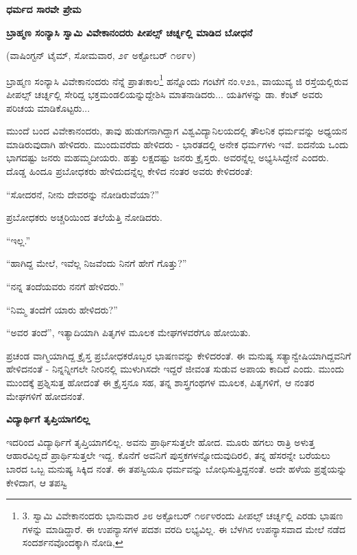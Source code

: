\begin{center}
\textbf{ಧರ್ಮದ ಸಾರವೇ ಪ್ರೇಮ}
\end{center}

\begin{center}
\textbf{ಬ್ರಾಹ್ಮಣ ಸಂನ್ಯಾಸಿ ಸ್ವಾಮಿ ವಿವೇಕಾನಂದರು ಪೀಪಲ್ಸ್ ಚರ್ಚ್ನಲ್ಲಿ ಮಾಡಿದ ಬೋಧನೆ}
\end{center}

(ವಾಷಿಂಗ್ಟನ್ ಟೈಮ್​, ಸೋಮವಾರ, ೨೯ ಅಕ್ಟೋಬರ್ ೧೮೯೪)

ಬ್ರಾಹ್ಮಣ ಸಂನ್ಯಾಸಿ ವಿವೇಕಾನಂದರು ನೆನ್ನೆ ಪ್ರಾತಃಕಾಲ\footnote{3. ಸ್ವಾಮಿ ವಿವೇಕಾನಂದರು ಭಾನುವಾರ ೨೮ ಅಕ್ಟೋಬರ್ ೧೮೯೪ರಂದು ಪೀಪಲ್ಸ್ ಚರ್ಚ್ನಲ್ಲಿ ಎರಡು ಭಾಷಣ ಗಳನ್ನು ಮಾಡಿದ್ದಾರೆ. ಈ ಉಪನ್ಯಾಸಗಳ ಪದಶಃ ವರದಿ ಲಭ್ಯವಿಲ್ಲ. ಈ ಬೆಳಗಿನ ಉಪನ್ಯಾಸವಾದ ಮೇಲೆ ನಡೆದ ಸಂದರ್ಶನವೊಂದಕ್ಕಾಗಿ ನೋಡಿ, } ಹನ್ನೊಂದು ಗಂಟೆಗೆ ನಂ.೪೨೩, ವಾಯುವ್ಯ ಜಿ ರಸ್ತೆಯಲ್ಲಿರುವ ಪೀಪಲ್ಸ್ ಚರ್ಚ್ನಲ್ಲಿ ಸೇರಿದ್ದ ಭಕ್ತಮಂಡಲಿಯನ್ನುದ್ದೇಶಿಸಿ ಮಾತನಾಡಿದರು... ಯತಿಗಳನ್ನು ಡಾ. ಕೆಂಟ್ ಅವರು ಪರಿಚಯ ಮಾಡಿಕೊಟ್ಟರು...

ಮುಂದೆ ಬಂದ ವಿವೇಕಾನಂದರು, ತಾವು ಹುಡುಗನಾಗಿದ್ದಾಗ ವಿಶ್ವವಿದ್ಯಾನಿಲಯದಲ್ಲಿ ತೌಲನಿಕ ಧರ್ಮವನ್ನು ಅಧ್ಯಯನ ಮಾಡಿರುವುದಾಗಿ ಹೇಳಿದರು. ಮುಂದುವರೆದು ಹೇಳಿದರು - ಭಾರತದಲ್ಲಿ ಅನೇಕ ಧರ್ಮಗಳು ಇವೆ. ಐದನೆಯ ಒಂದು ಭಾಗದಷ್ಟು ಜನರು ಮಹಮ್ಮದೀಯರು. ಹತ್ತು ಲಕ್ಷದಷ್ಟು ಜನರು ಕ್ರೈಸ್ತರು. ಅವರನ್ನೆಲ್ಲ ಅಭ್ಯಸಿಸಿದ್ದೇನೆ ಎಂದರು. ದೊಡ್ಡ ಹಿಂದೂ ಪ್ರಬೋಧಕರು ಹೇಳಿದುದನ್ನೆಲ್ಲ ಕೇಳಿದ ನಂತರ ಅವರು ಕೇಳಿದರಂತೆ:

“ಸೋದರನೆ, ನೀನು ದೇವರನ್ನು ನೋಡಿರುವೆಯಾ?”

ಪ್ರಬೋಧಕರು ಅಚ್ಚರಿಯಿಂದ ತಲೆಯೆತ್ತಿ ನೋಡಿದರು.

“ಇಲ್ಲ.”

“ಹಾಗಿದ್ದ ಮೇಲೆ, ಇವೆಲ್ಲ ನಿಜವೆಂದು ನಿನಗೆ ಹೇಗೆ ಗೊತ್ತು?”

“ನನ್ನ ತಂದೆಯವರು ನನಗೆ ಹೇಳಿದರು.”

“ನಿಮ್ಮ ತಂದೆಗೆ ಯಾರು ಹೇಳಿದರು?”

“ಅವರ ತಂದೆ”, ಇತ್ಯಾದಿಯಾಗಿ ಪಿತೃಗಳ ಮೂಲಕ ಮೇಘಗಳವರೆಗೂ ಹೋಯಿತು.

ಪ್ರಚಂಡ ವಾಗ್ಮಿಯಾಗಿದ್ದ ಕ್ರೈಸ್ತ ಪ್ರಬೋಧಕರೊಬ್ಬರ ಭಾಷಣವನ್ನು ಕೇಳಿದರಂತೆ. ಈ ಮನುಷ್ಯ ಸತ್ಯಾನ್ವೇಷಿಯಾಗಿದ್ದವನಿಗೆ ಹೇಳಿದನಂತೆ - ನಿನ್ನನ್ನೀಗಲೇ ನೀರಿನಲ್ಲಿ ಮುಳುಗಿಸದೇ ಇದ್ದರೆ ಜೀವಂತ ಸುಡುವ ಅಪಾಯ ಕಾದಿದೆ ಎಂದು. ಮುಂದು ಮುಂದಕ್ಕೆ ಪ್ರಶ್ನಿಸುತ್ತ ಹೋದಂತೆ ಈ ಕ್ರೈಸ್ತನೂ ಸಹ, ತನ್ನ ಶಾಸ್ತ್ರಗಂಥಗಳ ಮೂಲಕ, ಪಿತೃಗಳಿಗೆ, ಆ ನಂತರ ಮೇಘಗಳಿಗೆ ಹೋದನಂತೆ.

\begin{center}
\textbf{ವಿದ್ಯಾರ್ಥಿಗೆ ತೃಪ್ತಿಯಾಗಲಿಲ್ಲ}
\end{center}

ಇದರಿಂದ ವಿದ್ಯಾರ್ಥಿಗೆ ತೃಪ್ತಿಯಾಗಲಿಲ್ಲ. ಅವನು ಪ್ರಾರ್ಥಿಸುತ್ತಲೇ ಹೋದ. ಮೂರು ಹಗಲು ರಾತ್ರಿ ಅಳುತ್ತ ಆಹಾರವಿಲ್ಲದೆ ಪ್ರಾರ್ಥಿಸುತ್ತಲೇ ಇದ್ದ. ಕೊನೆಗೆ ಅವನಿಗೆ ಪುಸ್ತಕಗಳನ್ನೋದುವುದಿರಲಿ, ತನ್ನ ಹೆಸರನ್ನೇ ಬರೆಯಲು ಬಾರದ ಒಬ್ಬ ಮನುಷ್ಯ ಸಿಕ್ಕಿದ ನಂತೆ. ಈ ತಪಸ್ವಿಯೂ ಧರ್ಮವನ್ನು ಬೋಧಿಸುತ್ತಿದ್ದನಂತೆ. ಅದೇ ಹಳೆಯ ಪ್ರಶ್ನೆಯನ್ನು ಕೇಳಿದಾಗ, ಆ ತಪಸ್ವಿ

